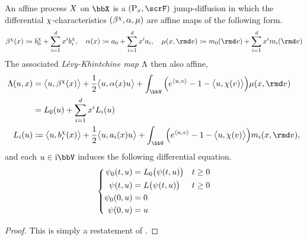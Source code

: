 \begin{theorem}
  \label{theorem:affine-regularity}
  An affine process $X$ on $\stateSpace$ is a $(\Prb_\stateVar, \scrF)$ jump-diffusion in which the differential $\chi$-characteristics $(\beta^\chi, \alpha, \mu)$ are affine maps of the following form.
  \begin{equation*}
    \affDrift^\trunc(\stateVar) \defeq \affDriftPart^\trunc_0 + \sum_{i=1}^d \stateVar^i \affDriftPart^\trunc_i, \quad
    \affDiff(\stateVar) \defeq \affDiffPart_0 + \sum_{i=1}^d \stateVar^i \affDiffPart_i, \quad
    \affJump(\stateVar, \rmd\markVar) \defeq \affJumpPart_0(\rmd\markVar) + \sum_{i=1}^d \stateVar^i \affJumpPart_i(\rmd\markVar)
  \end{equation*}
  The associated \emph{L\'evy-Khintchine map} $\Lambda$ then also affine,
  \begin{align*}
    \ode(\momentVar, \stateVar) 
    &= \bprj{\momentVar}{\affDrift^\trunc(\stateVar)} + \frac12 \bprj{\momentVar}{\affDiff(\stateVar)\momentVar} + \int_\vecSpace \Big( e^\prj{\momentVar}{\markVar} - 1 - \bprj{\momentVar}{\trunc(\markVar)} \Big) \affJump(\stateVar, \rmd\markVar) \\
    &= \odePart_0(\momentVar) + \sum_{i=1}^d \stateVar^i \odePart_i(\momentVar) \\
    \odePart_i(\momentVar)
    &\defeq \bprj{\momentVar}{\affDriftPart_i^\trunc(\stateVar)} + \frac12\bprj{\momentVar}{\affDiffPart_i(\stateVar)\momentVar} + \int_\vecSpace \Big( e^\prj{\momentVar}{\markVar} - 1 - \bprj{\momentVar}{\trunc(\markVar)} \Big) \affJumpPart_i(\stateVar, \rmd\markVar),
  \end{align*}
  and each $\momentVar \in \im\vecSpace$ induces the following differential equation.
  \begin{equation}
    \label{eq:complex-riccati-charts}
    \left\{\begin{aligned}
      \psi_0(t,u) &= L_0\big(\psi(t, u)\big) & t \geq 0 \\
      \psi(t,u) &= L\big(\psi(t,u)\big) & t \geq 0 \\
      \psi_0(0,u) &= 0 \\
      \psi(0, u) &= u
    \end{aligned}\right.
  \end{equation}
\end{theorem}
\begin{proof}
  \label{proof:affine-regularity}
  This is simply a restatement of \cite[Theorem 1.5.4]{cuchiero2011}.
\end{proof}

